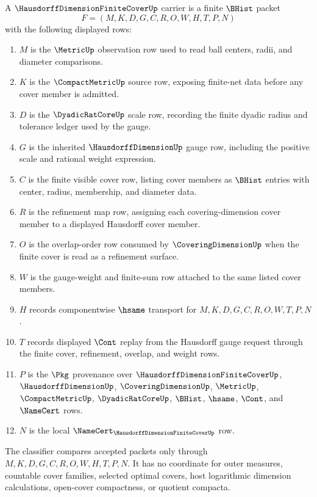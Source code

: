 \begin{definition}
\label{def:hausdorff-dimension-finite-cover-carrier}
A $\HausdorffDimensionFiniteCoverUp$ carrier is a finite $\BHist$ packet
$$
F=(M,K,D,G,C,R,O,W,H,T,P,N)
$$
with the following displayed rows:
\begin{enumerate}
\item $M$ is the $\MetricUp$ observation row used to read ball centers, radii, and diameter comparisons.
\item $K$ is the $\CompactMetricUp$ source row, exposing finite-net data before any cover member is admitted.
\item $D$ is the $\DyadicRatCoreUp$ scale row, recording the finite dyadic radius and tolerance ledger used by the gauge.
\item $G$ is the inherited $\HausdorffDimensionUp$ gauge row, including the positive scale and rational weight expression.
\item $C$ is the finite visible cover row, listing cover members as $\BHist$ entries with center, radius, membership, and diameter data.
\item $R$ is the refinement map row, assigning each covering-dimension cover member to a displayed Hausdorff cover member.
\item $O$ is the overlap-order row consumed by $\CoveringDimensionUp$ when the finite cover is read as a refinement surface.
\item $W$ is the gauge-weight and finite-sum row attached to the same listed cover members.
\item $H$ records componentwise $\hsame$ transport for $M,K,D,G,C,R,O,W,T,P,N$.
\item $T$ records displayed $\Cont$ replay from the Hausdorff gauge request through the finite cover, refinement, overlap, and weight rows.
\item $P$ is the $\Pkg$ provenance over $\HausdorffDimensionFiniteCoverUp$, $\HausdorffDimensionUp$, $\CoveringDimensionUp$, $\MetricUp$, $\CompactMetricUp$, $\DyadicRatCoreUp$, $\BHist$, $\hsame$, $\Cont$, and $\NameCert$ rows.
\item $N$ is the local $\NameCert_{\HausdorffDimensionFiniteCoverUp}$ row.
\end{enumerate}
The classifier compares accepted packets only through $M,K,D,G,C,R,O,W,H,T,P,N$. It has no coordinate for outer measures, countable cover families, selected optimal covers, host logarithmic dimension calculations, open-cover compactness, or quotient compacta.
\end{definition}


